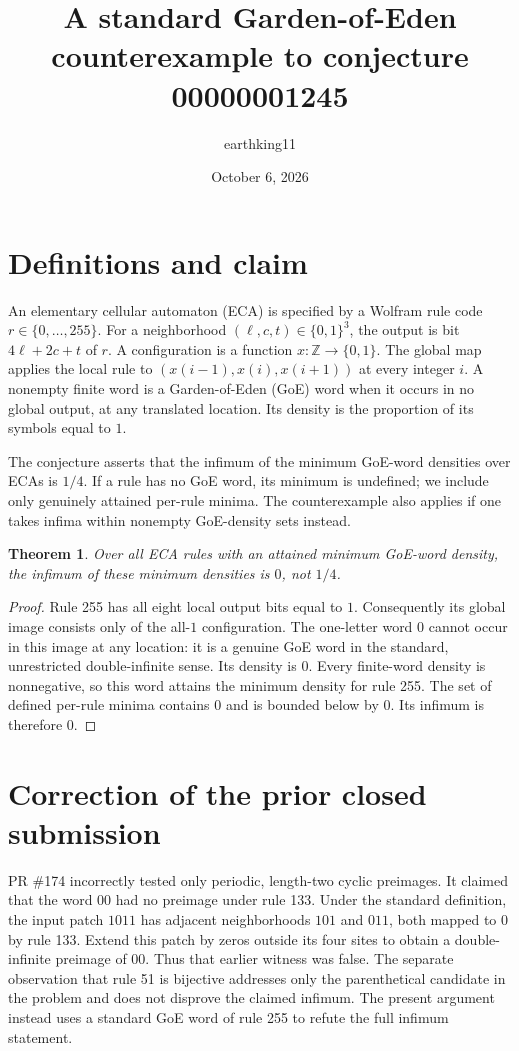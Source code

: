 \documentclass[10pt]{article}
\title{A standard Garden-of-Eden counterexample to conjecture 00000001245}
\author{earthking11}
\date{October 6, 2026}
\newtheorem{theorem}{Theorem}
\begin{document}
\maketitle
\section*{Definitions and claim}
An elementary cellular automaton (ECA) is specified by a Wolfram rule code
$r\in\{0,\ldots,255\}$. For a neighborhood $(\ell,c,t)\in\{0,1\}^3$,
the output is bit $4\ell+2c+t$ of $r$. A configuration is a function
$x:\mathbb Z\to\{0,1\}$. The global map applies the local rule to
$(x(i-1),x(i),x(i+1))$ at every integer $i$.
A nonempty finite word is a Garden-of-Eden (GoE) word when it occurs in no
global output, at any translated location. Its density is the proportion
of its symbols equal to $1$.

The conjecture asserts that the infimum of the minimum GoE-word densities
over ECAs is $1/4$. If a rule has no GoE word, its minimum is undefined;
we include only genuinely attained per-rule minima. The counterexample
also applies if one takes infima within nonempty GoE-density sets instead.

\begin{theorem}
Over all ECA rules with an attained minimum GoE-word density, the infimum
of these minimum densities is $0$, not $1/4$.
\end{theorem}
\begin{proof}
Rule 255 has all eight local output bits equal to $1$. Consequently its
global image consists only of the all-$1$ configuration. The one-letter
word $0$ cannot occur in this image at any location: it is a genuine GoE
word in the standard, unrestricted double-infinite sense. Its density is
$0$. Every finite-word density is nonnegative, so this word attains the
minimum density for rule 255. The set of defined per-rule minima contains
$0$ and is bounded below by $0$. Its infimum is therefore $0$.
\end{proof}

\section*{Correction of the prior closed submission}
PR \#174 incorrectly tested only periodic, length-two cyclic preimages.
It claimed that the word $00$ had no preimage under rule 133. Under the
standard definition, the input patch $1011$ has adjacent neighborhoods
$101$ and $011$, both mapped to $0$ by rule 133. Extend this patch by zeros
outside its four sites to obtain a double-infinite preimage of $00$.
Thus that earlier witness was false. The separate observation that rule
51 is bijective addresses only the parenthetical candidate in the problem
and does not disprove the claimed infimum. The present argument instead
uses a standard GoE word of rule 255 to refute the full infimum statement.
\end{document}
